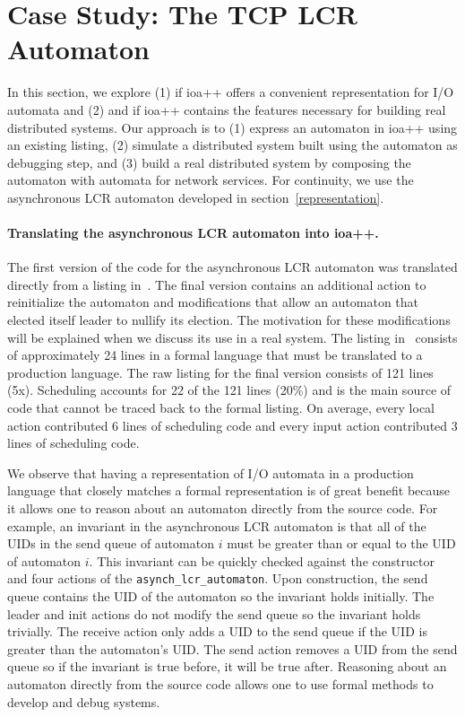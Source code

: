 \section{Case Study:  The TCP LCR Automaton\label{case_study}}

In this section, we explore (1) if ioa++ offers a convenient representation for I/O automata and (2) and if ioa++ contains the features necessary for building real distributed systems.
Our approach is to (1) express an automaton in ioa++ using an existing listing, (2) simulate a distributed system built using the automaton as debugging step, and (3) build a real distributed system by composing the automaton with automata for network services.
For continuity, we use the asynchronous LCR automaton developed in section~\ref{representation}.

\paragraph{Translating the asynchronous LCR automaton into ioa++.}
The first version of the code for the asynchronous LCR automaton was translated directly from a listing in~\cite{lynch1996distributed}.
The final version contains an additional action to reinitialize the automaton and modifications that allow an automaton that elected itself leader to nullify its election.
The motivation for these modifications will be explained when we discuss its use in a real system.
The listing in~\cite{lynch1996distributed} consists of approximately 24 lines in a formal language that must be translated to a production language.
The raw listing for the final version consists of 121 lines (5x).
Scheduling accounts for 22 of the 121 lines (20\%) and is the main source of code that cannot be traced back to the formal listing.
On average, every local action contributed 6 lines of scheduling code and every input action contributed 3 lines of scheduling code.

We observe that having a representation of I/O automata in a production language that closely matches a formal representation is of great benefit because it allows one to reason about an automaton directly from the source code.
For example, an invariant in the asynchronous LCR automaton is that all of the UIDs in the send queue of automaton $i$ must be greater than or equal to the UID of automaton $i$.
This invariant can be quickly checked against the constructor and four actions of the \verb+asynch_lcr_automaton+.
Upon construction, the send queue contains the UID of the automaton so the invariant holds initially.
The leader and init actions do not modify the send queue so the invariant holds trivially.
The receive action only adds a UID to the send queue if the UID is greater than the automaton's UID.
The send action removes a UID from the send queue so if the invariant is true before, it will be true after.
Reasoning about an automaton directly from the source code allows one to use formal methods to develop and debug systems.


